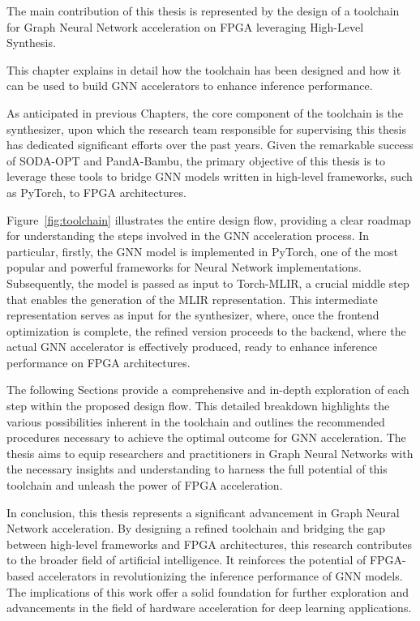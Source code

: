 The main contribution of this thesis is represented by the design of a toolchain for Graph Neural Network acceleration on FPGA leveraging High-Level Synthesis.

This chapter explains in detail how the toolchain has been designed and how it can be used to build GNN accelerators to enhance inference performance.

As anticipated in previous Chapters, the core component of the toolchain is the synthesizer, upon which the research team responsible for supervising this thesis has dedicated significant efforts over the past years.
Given the remarkable success of SODA-OPT and PandA-Bambu, the primary objective of this thesis is to leverage these tools to bridge GNN models written in high-level frameworks, such as PyTorch, to FPGA architectures.

Figure~\ref{fig:toolchain} illustrates the entire design flow, providing a clear roadmap for understanding the steps involved in the GNN acceleration process.
In particular, firstly, the GNN model is implemented in PyTorch, one of the most popular and powerful frameworks for Neural Network implementations.
Subsequently, the model is passed as input to Torch-MLIR, a crucial middle step that enables the generation of the MLIR representation.
This intermediate representation serves as input for the synthesizer, where, once the frontend optimization is complete, the refined version proceeds to the backend, where the actual GNN accelerator is effectively produced, ready to enhance inference performance on FPGA architectures.

The following Sections provide a comprehensive and in-depth exploration of each step within the proposed design flow.
This detailed breakdown highlights the various possibilities inherent in the toolchain and outlines the recommended procedures necessary to achieve the optimal outcome for GNN acceleration.
The thesis aims to equip researchers and practitioners in Graph Neural Networks with the necessary insights and understanding to harness the full potential of this toolchain and unleash the power of FPGA acceleration.

In conclusion, this thesis represents a significant advancement in Graph Neural Network acceleration.
By designing a refined toolchain and bridging the gap between high-level frameworks and FPGA architectures, this research contributes to the broader field of artificial intelligence.
It reinforces the potential of FPGA-based accelerators in revolutionizing the inference performance of GNN models.
The implications of this work offer a solid foundation for further exploration and advancements in the field of hardware acceleration for deep learning applications.

